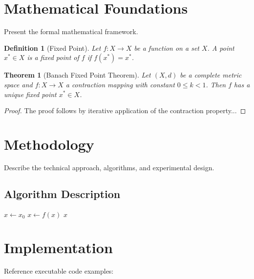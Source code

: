 \documentclass[11pt,letterpaper]{article}
\newtheorem{theorem}{Theorem}[section]
\newtheorem{definition}{Definition}[section]
\begin{document}
\section{Mathematical Foundations}

Present the formal mathematical framework.

\begin{definition}[Fixed Point]
Let $f: X \to X$ be a function on a set $X$. A point $x^* \in X$ 
is a \emph{fixed point} of $f$ if $f(x^*) = x^*$.
\end{definition}

\begin{theorem}[Banach Fixed Point Theorem]
Let $(X, d)$ be a complete metric space and $f: X \to X$ a contraction 
mapping with constant $0 \le k < 1$. Then $f$ has a unique fixed point 
$x^* \in X$.
\end{theorem}

\begin{proof}
The proof follows by iterative application of the contraction property...
\end{proof}

\section{Methodology}

Describe the technical approach, algorithms, and experimental design.

\subsection{Algorithm Description}

\begin{algorithm}
\caption{Fixed Point Iteration}
\begin{algorithmic}[1]
    \State $x \gets x_0$
        \State $x \gets f(x)$
    \EndWhile
    \State \Return $x$
\EndProcedure
\end{algorithmic}
\end{algorithm}

\section{Implementation}

Reference executable code examples:


\end{document}
